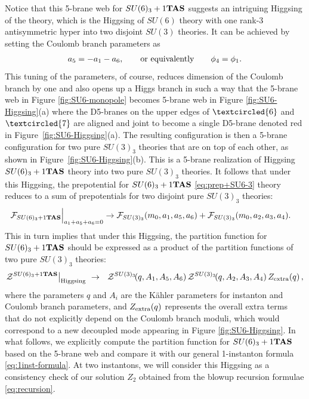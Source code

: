 \documentclass[letterpaper, 11pt]{article}
\def\CZ{{\cal Z}}
\begin{document}
{Notice that this 5-brane web for $SU(6)_3+1{\bf TAS}$ suggests an intriguing Higgsing of the theory, which is the Higgsing of $SU(6)$ theory with one rank-3 antisymmetric hyper into two disjoint $SU(3)$ theories. It can be achieved by setting the Coulomb branch parameters as
 \begin{align}
 	a_5= - a_1-a_6, \qquad {\rm or~equivalently} \qquad \phi_4=\phi_1. \label{eq:HiggisingToSU3}
 \end{align}
 This tuning of the parameters, of course, reduces dimension of the Coulomb branch by one and also opens up a Higgs branch in such a way that the 5-brane web in Figure \ref{fig:SU6-monopole} becomes 5-brane web in Figure \ref{fig:SU6-Higgsing}(a) where the D5-branes on the upper edges of $\textcircled{\scriptsize 6}$ and $\textcircled{\scriptsize 7}$ are aligned and joint to become a single D5-brane denoted red in Figure~\ref{fig:SU6-Higgsing}(a). The resulting configuration is then a 5-brane configuration for two pure $SU(3)_3$ theories that are on top of each other, as shown in Figure~\ref{fig:SU6-Higgsing}(b). This is a 5-brane realization of Higgsing $SU(6)_3+1{\bf TAS}$ theory into two pure $SU(3)_3$ theories. It follows that 
 under this Higgsing, the prepotential for $SU(6)_3+1{\bf TAS}$ \eqref{eq:prep+SU6-3} theory reduces to a sum of prepotentials for two disjoint pure $SU(3)_3$ theories:
\begin{align}
\mathcal{F}_{SU(6)_{3}+1{\bf TAS}}{}\Big|_{a_1+a_5+a_6=0}	%
&\rightarrow \mathcal{F}_{SU(3)_3}(m_0,a_1,a_5,a_6)+\mathcal{F}_{SU(3)_3}(m_0,a_2,a_3,a_4).
\end{align}
This in turn implies that under this Higgsing, the partition function for $SU(6)_{3}+1{\bf TAS}$ should be expressed as a product of the partition functions of two pure $SU(3)_3$ theories:
\begin{align}
\CZ^{SU(6)_{3}+1{\bf TAS}}\big|_{\rm Higgsing}~\rightarrow ~~ \CZ^{SU(3)_{3}}\!(q,A_1, A_5,A_6)\,\CZ^{SU(3)_{3}}\!(q,A_2, A_3,A_4)\,Z_{\rm extra}(q)\,,
\label{eq:SU6-Higgs-SU3}	
\end{align}
where the parameters $q$ and $A_i$ are the K\"ahler parameters for instanton and Coulomb branch parameters, and  $Z_{\rm extra}(q)$ represents the overall extra terms that do not explicitly depend on the Coulomb branch moduli, which would correspond to a new decoupled mode appearing in Figure \ref{fig:SU6-Higgsing}.  In what follows, we explicitly compute the partition function for $SU(6)_3+1{\bf TAS}$ based on the 5-brane web and compare it with our general 1-instanton formula \eqref{eq:1inst-formula}. At two instantons, we will consider this Higgsing as a consistency check of our solution $Z_2$ obtained from the blowup recursion formulae \eqref{eq:recursion}.

}
\end{document}
